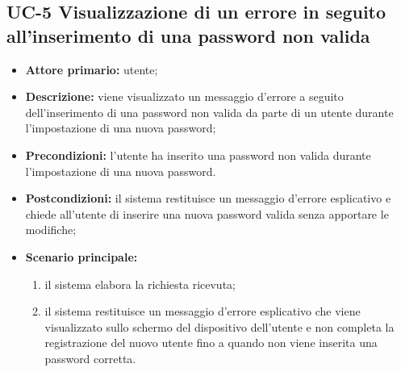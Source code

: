 \subsection{UC-5 Visualizzazione di un errore in seguito all'inserimento di una password non valida}
\begin{itemize}
	\item \textbf{Attore primario:} utente;

	\item \textbf{Descrizione:} viene visualizzato un messaggio d'errore a seguito dell'inserimento di una password non valida da parte di un utente durante l'impostazione di una nuova password;

	\item \textbf{Precondizioni:} l'utente ha inserito una password non valida durante l'impostazione di una nuova password.

	\item \textbf{Postcondizioni:} il sistema restituisce un messaggio d'errore esplicativo e chiede all'utente di inserire una nuova password valida senza apportare le modifiche;

	\item \textbf{Scenario principale:}
	      \begin{enumerate}
		      \item il sistema elabora la richiesta ricevuta;
		      \item il sistema restituisce un messaggio d'errore esplicativo che viene visualizzato sullo schermo del dispositivo dell'utente e non completa la registrazione del nuovo utente fino a quando non viene inserita una password corretta.
	      \end{enumerate}
\end{itemize}

